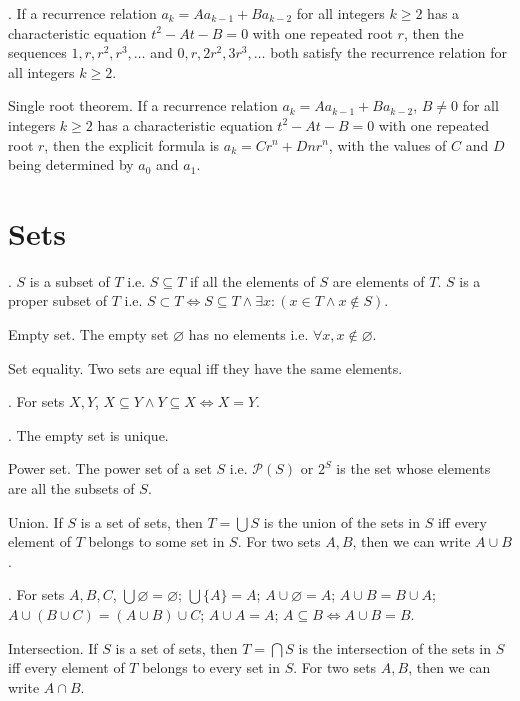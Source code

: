 \documentclass{slnotes}
\begin{document}
. If a recurrence relation \(a_k = Aa_{k-1} + Ba_{k-2}\) for all integers \(k \ge 2\) has a characteristic equation \(t^2 - At - B = 0\) with one repeated root \(r\), then the sequences \(1, r, r^2, r^3, \hdots\) and \(0, r, 2r^2, 3r^3, \hdots\) both satisfy the recurrence relation for all integers \(k \ge 2\).

 Single root theorem. If a recurrence relation \(a_k = Aa_{k-1} + Ba_{k-2}\), \(B \neq 0\) for all integers \(k \ge 2\) has a characteristic equation \(t^2 - At - B = 0\) with one repeated root \(r\), then the explicit formula is \(a_k = Cr^n + Dnr^n\), with the values of \(C\) and \(D\) being determined by \(a_0\) and \(a_1\).

\chapter{Sets}
. \(S\) is a subset of \(T\) i.e. \(S \subseteq T\) if all the elements of \(S\) are elements of \(T\). \(S\) is a proper subset of \(T\) i.e. \(S \subset T \Leftrightarrow S \subseteq T \land \exists x : (x \in T \land x \not\in S)\).

 Empty set. The empty set \(\varnothing\) has no elements i.e. \(\forall x, x \not\in\varnothing\).

 Set equality. Two sets are equal iff they have the same elements.

. For sets \(X, Y\), \(X \subseteq Y \land Y \subseteq X \Leftrightarrow X = Y\).

. The empty set is unique.

 Power set. The power set of a set \(S\) i.e. \(\mathcal{P}(S)\) or \(2^S\) is the set whose elements are all the subsets of \(S\).

 Union. If \(S\) is a set of sets, then \(T = \bigcup S\) is the union of the sets in \(S\) iff every element of \(T\) belongs to some set in \(S\). For two sets \(A, B\), then we can write \(A \cup B\).

. For sets \(A, B, C\), \(\bigcup\varnothing = \varnothing\); \(\bigcup\{A\}=A\); \(A\cup\varnothing=A\); \(A\cup B=B\cup A\); \(A\cup (B\cup C) = (A\cup B)\cup C\); \(A\cup A = A\); \(A \subseteq B \Leftrightarrow A\cup B = B\).

 Intersection. If \(S\) is a set of sets, then \(T = \bigcap S\) is the intersection of the sets in \(S\) iff every element of \(T\) belongs to every set in \(S\). For two sets \(A, B\), then we can write \(A \cap B\).
\end{document}
